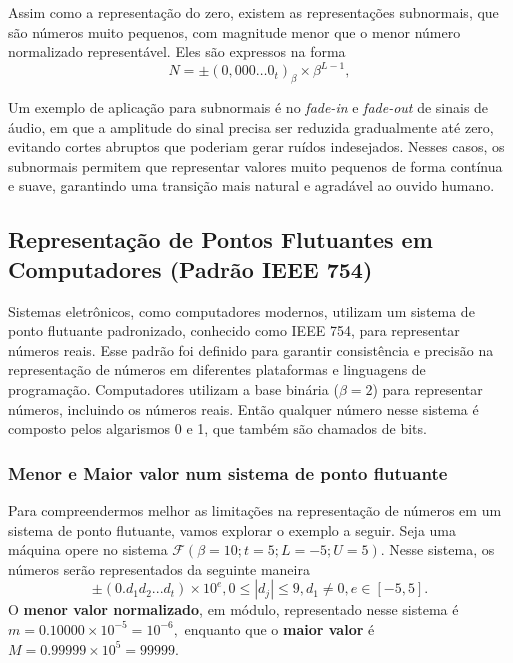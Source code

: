Assim como a representação do zero, existem as representações subnormais, que
são números muito pequenos, com magnitude menor que o menor número normalizado
representável. Eles são expressos na forma
\begin{equation}
  N = \pm (0{,}000\ldots 0_{t})_\beta \times \beta^{L - 1},
\end{equation}

Um exemplo de aplicação para subnormais é no \textit{fade-in} e
\textit{fade-out} de sinais de áudio, em que a amplitude do sinal precisa ser
reduzida gradualmente até zero, evitando cortes abruptos que poderiam gerar
ruídos indesejados. Nesses casos, os subnormais permitem que representar
valores muito pequenos de forma contínua e suave, garantindo uma transição mais
natural e agradável ao ouvido humano.


\subsection{Representação de Pontos Flutuantes em Computadores (Padrão IEEE 754)}
Sistemas eletrônicos, como computadores modernos, utilizam um sistema de ponto
flutuante padronizado, conhecido como IEEE 754, para representar números reais.
Esse padrão foi definido para garantir consistência e precisão na representação
de números em diferentes plataformas e linguagens de programação. Computadores
utilizam a base binária ($\beta= 2$) para representar números, incluindo os
números reais. Então qualquer número nesse sistema é composto pelos algarismos
0 e 1, que também são chamados de bits.

\subsubsection*{Menor e Maior valor num sistema de ponto flutuante}

Para compreendermos melhor as limitações na representação de números em um
sistema de ponto flutuante, vamos explorar o exemplo a seguir. Seja uma máquina
opere no sistema $\mathcal{F}(\beta=10; t=5; L=-5; U=5)$. Nesse sistema, os
números serão representados da seguinte maneira
\begin{equation*}
  \pm (0.d_{1}d_{2} . . . d_{t}) \times 10^e,  0 \leq |d_{j}| \leq 9,  d_{1} \neq 0, e \in [-5,5].
\end{equation*}
O \textbf{menor valor normalizado}, em módulo, representado nesse sistema é
$  m = 0.10000 \times 10^{-5} = 10^{-6},$ enquanto que o \textbf{maior valor } é $M = 0.99999 \times 10^{5} = 99999$.

